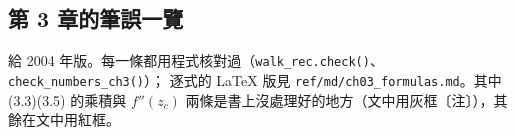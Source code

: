 \subsection{第 3 章的筆誤一覽}
給 2004 年版。每一條都用程式核對過（\texttt{walk\_rec.check()}、\texttt{check\_numbers\_ch3()}）；
逐式的 LaTeX 版見 \texttt{ref/md/ch03\_formulas.md}。其中 (3.3)(3.5) 的乘積與 $f''(z_c)$ 兩條是書上沒處理好的地方（文中用灰框〔注〕），其餘在文中用紅框。
\begin{center}
\footnotesize
\ThreeTabErrata
\end{center}
